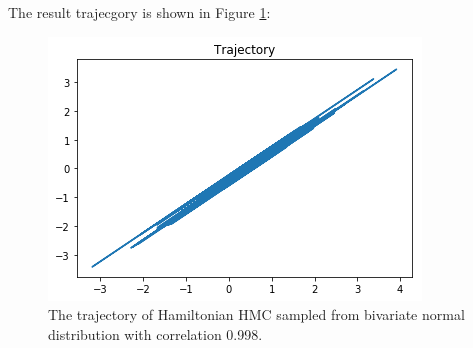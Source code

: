 \documentclass{article}
\begin{document}
\begin{enumerate}
The result trajecgory is shown in Figure \ref{fig_p5}:

\begin{figure}[ht]
\includegraphics[width=\textwidth]{./plots/p5.png}
\caption{The trajectory of Hamiltonian HMC sampled from bivariate normal distribution with correlation 0.998.}
\label{fig_p5}
\end{figure}

\end{enumerate}



\end{document}
